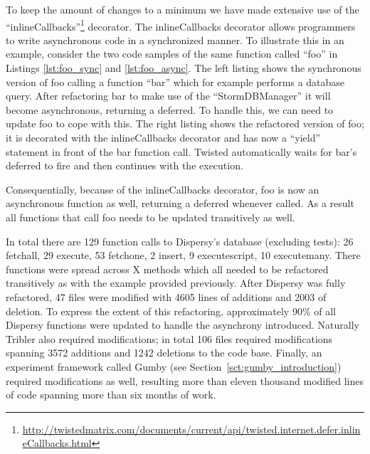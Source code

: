 To keep the amount of changes to a minimum we have made extensive use of the \enquote{inlineCallbacks}\footnote{\url{http://twistedmatrix.com/documents/current/api/twisted.internet.defer.inlineCallbacks.html}} decorator.
The inlineCallbacks decorator allows programmers to write asynchronous code in a synchronized manner.
To illustrate this in an example, consider the two code samples of the same function called \enquote{foo} in Listings \ref{lst:foo_sync} and \ref{lst:foo_async}.
The left listing shows the synchronous version of foo calling a function \enquote{bar} which for example performs a database query.
After refactoring bar to make use of the \enquote{StormDBManager} it will become asynchronous, returning a deferred.
To handle this, we can need to update foo to cope with this.
The right listing shows the refactored version of foo; it is decorated with the inlineCallbacks decorator and has now a \enquote{yield} statement in front of the bar function call.
Twisted automatically waits for bar's deferred to fire and then continues with the execution.

Consequentially, because of the inlineCallbacks decorator, foo is now an asynchronous function as well, returning a deferred whenever called.
As a result all functions that call foo needs to be updated transitively as well.

In total there are 129 function calls to Dispersy's database (excluding tests): 26 fetchall, 29 execute, 53 fetchone, 2 insert, 9 executescript, 10 executemany.
There functions were spread across X methods which all needed to be refactored transitively as with the example provided previously.
After Dispersy was fully refactored, 47 files were modified with 4605 lines of additions and 2003 of deletion.
To express the extent of this refactoring, approximately 90\% of all Dispersy functions were updated to handle the asynchrony introduced.
Naturally Tribler also required modifications; in total 106 files required modifications spanning 3572 additions and 1242 deletions to the code base.
Finally, an experiment framework called Gumby (see Section~\ref{sct:gumby_introduction}) required modifications as well, resulting more than eleven thousand modified lines of code spanning more than six months of work.



